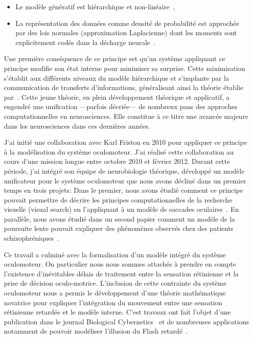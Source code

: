 \documentclass[11pt,french,a4paper,oneside]{article}%
\begin{document}
\begin{itemize}
\item Le modèle génératif est hiérarchique et non-linéaire~\citep{Friston08b},
\item La représentation des données comme densité de probabilité est approchée par des lois normales (approximation Laplacienne) dont les moments sont explicitement codés dans la décharge neurale~\citep{Friston09a}.
\end{itemize}
Une première conséquence de ce principe est qu'un système appliquant ce principe modifie son état interne pour minimiser sa surprise. Cette minimisation s'établit aux différents niveaux du modèle hiérarchique et s'implante par la communication de transferts d'informations, généralisant ainsi la théorie établie par~\citet{Mumford92}. Cette jeune théorie, en plein développement théorique et applicatif, a engendré une unification ---parfois décriée--- de nombreux pans des approches computationnelles en neurosciences. Elle constitue à ce titre une avancée majeure dans les neurosciences dans ces dernières années.

J'ai initié une collaboration avec Karl Friston en 2010 pour appliquer ce principe à la modélisation du système oculomoteur. J'ai réalisé cette collaboration au cours d'une mission longue entre octobre 2010 et février 2012. Durant cette période, j'ai intégré son équipe de neurobiologie théorique, développé un modèle unificateur pour le système oculomoteur que nous avons décliné dans un premier temps en trois projets: Dans le premier, nous avons étudié comment ce principe pouvait permettre de décrire les principes computationnelles de la recherche visuelle (visual search) en l'appliquant à un modèle de saccades oculaires~\citep{Friston12}. En parallèle, nous avons étudié dans un second papier comment un modèle de la poursuite lente pouvait expliquer des phénomènes observés chez des patients schizophréniques~\citep{Adams12}.

Ce travail a culminé avec la formalisation d'un modèle intégré du système oculomoteur. On particulier nous nous sommes attachés à prendre en compte l'existence d'inévitables délais de traitement entre la sensation rétinienne et la prise de décision oculo-motrice. L'inclusion de cette contrainte du système oculomoteur nous a permis le développement d'une théorie mathématique novatrice pour expliquer l'intégration du mouvement entre une sensation rétinienne retardée et le modèle interne. C'est travaux ont fait l'objet d'une publication dans le journal Biological Cybernetics~\citep{PerrinetAdamsFriston14} et de nombreuses applications notamment de pouvoir modéliser l'illusion du Flash retardé~\citep{KhoeiMassonPerrinet17}.
\end{document}
